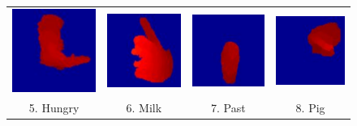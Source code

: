 \documentclass[final,3p,times,twocolumn]{elsarticle}
\begin{document}
\begin{figure}[h]
{\begin{tabular}{cccc}
			\includegraphics[width=0.22\columnwidth]{Figures/MSRGesture3D_hungry.pdf} &          \includegraphics[width=0.22\columnwidth]{Figures/MSRGesture3D_milk.pdf} &          \includegraphics[width=0.22\columnwidth]{Figures/MSRGesture3D_past.pdf} &          \includegraphics[width=0.22\columnwidth]{Figures/MSRGesture3D_pig.pdf} \\
			
			5. Hungry &          6. Milk &          7. Past &          8. Pig \\
			

\end{tabular}}
\end{figure}
\end{document}
